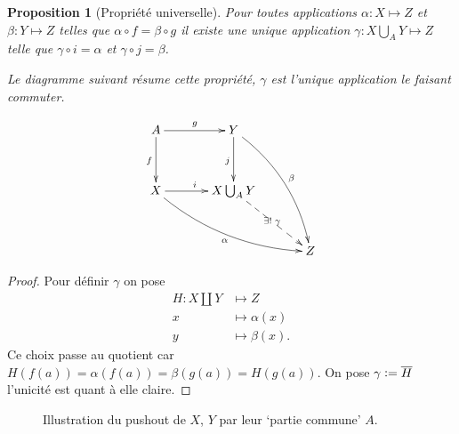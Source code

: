 \documentclass[12pt]{book}
\newcommand{\defeq}{\vcentcolon=}
\newtheorem{prop}[lemma]{Proposition}
\theoremstyle{definition}
\theoremstyle{remark}
\begin{document}
	\begin{prop}[Propriété universelle]
		Pour toutes applications $\alpha : X \longmapsto Z$ et\\
		$\beta : Y \longmapsto Z$ telles que $\alpha \circ f = \beta \circ g$ il existe une \emph{unique} application  $\gamma : X \bigcup_A Y \longmapsto Z$ telle que $\gamma \circ i = \alpha$ et  $\gamma \circ j = \beta$.

		\begin{minipage}{0.5\textwidth}
			Le diagramme suivant résume cette propriété, $\gamma$ est l'unique application le faisant commuter.
		\end{minipage}
		\hfill
		\begin{minipage}{0.5\textwidth}
			\[
			\xymatrix@R=1.2cm@C=1.2cm{
			 A \ar[r]^{g}      \ar[d]_{f}         & Y \ar[d]_{j} \ar@/^1pc/[rdd]^{\beta}   \\
			 X \ar[r]^{i} \ar@/_1pc/[rrd]_{\alpha} & X\bigcup_A Y \ar@{-->}[rd]|{\exists! \; \gamma}             \\
							      &                                   & Z 
			}
	\]	
		\end{minipage}
	\end{prop}
	\begin{proof}
		Pour définir $\gamma$ on pose  
		\begin{align*}
			H : X \coprod Y &\longmapsto Z \\
			x &\longmapsto \alpha(x) \\
			y &\longmapsto \beta(x)
		.\end{align*}
		Ce choix passe au quotient car $H(f(a)) = \alpha(f(a)) = \beta(g(a)) = H(g(a))$. On pose  $\gamma \defeq \overline{H}$ l'unicité est quant à elle claire.
	\end{proof}
	
	\begin{figure}[ht]
		\centering
		\def\svgwidth{0.5\textwidth}
		
		\caption{Illustration du pushout de $X$, $Y$ par leur `partie commune' $A$.}
	\end{figure}
\end{document}
